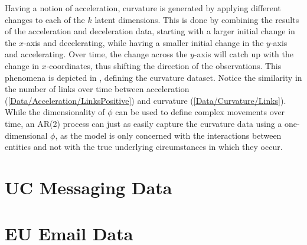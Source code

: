         Having a notion of acceleration, curvature is generated by applying different changes to each of the $k$ latent dimensions. This is done by combining the results of the acceleration and deceleration data, starting with a larger initial change in the $x$-axis and decelerating, while having a smaller initial change in the $y$-axis and accelerating. Over time, the change across the $y$-axis will catch up with the change in $x$-coordinates, thus shifting the direction of the observations. This phenomena is depicted in , defining the curvature dataset.
        Notice the similarity in the number of links over time between acceleration (\cref{Data/Acceleration/LinksPositive}) and curvature (\cref{Data/Curvature/Links}). While the dimensionality of $\phi$ can be used to define complex movements over time, an AR(2) process can just as easily capture the curvature data using a one-dimensional $\phi$, as the model is only concerned with the interactions between entities and not with the true underlying circumstances in which they occur.
        
\section{UC Messaging Data}

    
\section{EU Email Data}

